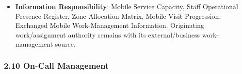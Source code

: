 \begin{itemize}
\begin{itemize}
\begin{itemize}
\item 
\emph{Terminology}: External “work/\allowbreak{}task” vocabulary does not make human work a Harmonia Task. Work Order means human doing; To Do means human review/\allowbreak{}update/\allowbreak{}approval; Task means synthetic task. The preferred Strategy name \texttt{} remains a proposed naming correction pending human confirmation, not a new Feature or alias.



\end{itemize}


\end{itemize}


\item 
\textbf{Information Responsibility}: Mobile Service Capacity, Staff Operational Presence Register, Zone Allocation Matrix, Mobile Visit Progression, Exchanged Mobile Work-Management Information. Originating work/\allowbreak{}assignment authority remains with its external/\allowbreak{}business work-management source.



\end{itemize}
\label{rad:hso:208}

\par\smallskip
{}\label{rad:hso:210}
\subsubsection*{2.10 On-Call Management}
\label{rad:hso:211}

